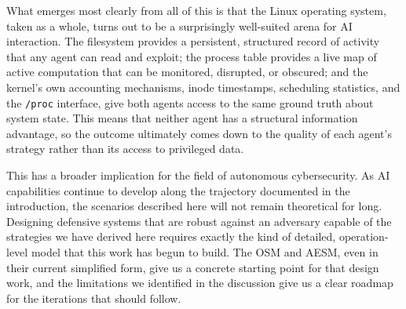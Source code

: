 What emerges most clearly from all of this is that the Linux operating system, taken as a whole, turns out to be a surprisingly well-suited arena for AI interaction. The filesystem provides a persistent, structured record of activity that any agent can read and exploit; the process table provides a live map of active computation that can be monitored, disrupted, or obscured; and the kernel's own accounting mechanisms, inode timestamps, scheduling statistics, and the \texttt{/proc} interface, give both agents access to the same ground truth about system state. This means that neither agent has a structural information advantage, so the outcome ultimately comes down to the quality of each agent's strategy rather than its access to privileged data.

This has a broader implication for the field of autonomous cybersecurity. As AI capabilities continue to develop along the trajectory documented in the introduction, the scenarios described here will not remain theoretical for long. Designing defensive systems that are robust against an adversary capable of the strategies we have derived here requires exactly the kind of detailed, operation-level model that this work has begun to build. The OSM and AESM, even in their current simplified form, give us a concrete starting point for that design work, and the limitations we identified in the discussion give us a clear roadmap for the iterations that should follow.